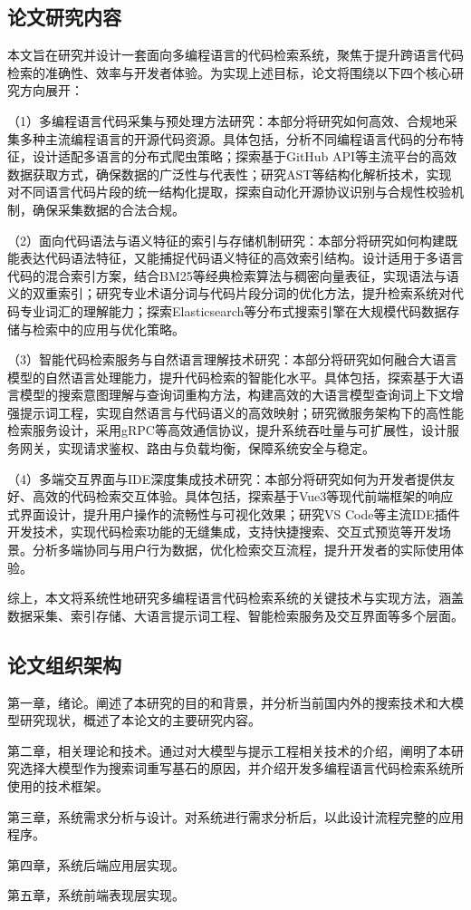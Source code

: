 \documentclass[UTF8,a4paper,12pt]{ctexart}
\numberwithin{equation}{section}
\begin{document}
\subsection{论文研究内容}
本文旨在研究并设计一套面向多编程语言的代码检索系统，聚焦于提升跨语言代码检索的准确性、效率与开发者体验。为实现上述目标，论文将围绕以下四个核心研究方向展开：\par
（1）多编程语言代码采集与预处理方法研究：本部分将研究如何高效、合规地采集多种主流编程语言的开源代码资源。具体包括，分析不同编程语言代码的分布特征，设计适配多语言的分布式爬虫策略；探索基于GitHub API等主流平台的高效数据获取方式，确保数据的广泛性与代表性；研究AST等结构化解析技术，实现对不同语言代码片段的统一结构化提取，探索自动化开源协议识别与合规性校验机制，确保采集数据的合法合规。\par
（2）面向代码语法与语义特征的索引与存储机制研究：本部分将研究如何构建既能表达代码语法特征，又能捕捉代码语义特征的高效索引结构。设计适用于多语言代码的混合索引方案，结合BM25等经典检索算法与稠密向量表征，实现语法与语义的双重索引；研究专业术语分词与代码片段分词的优化方法，提升检索系统对代码专业词汇的理解能力；探索Elasticsearch等分布式搜索引擎在大规模代码数据存储与检索中的应用与优化策略。\par
（3）智能代码检索服务与自然语言理解技术研究：本部分将研究如何融合大语言模型的自然语言处理能力，提升代码检索的智能化水平。具体包括，探索基于大语言模型的搜索意图理解与查询词重构方法，构建高效的大语言模型查询词上下文增强提示词工程，实现自然语言与代码语义的高效映射；研究微服务架构下的高性能检索服务设计，采用gRPC等高效通信协议，提升系统吞吐量与可扩展性，设计服务网关，实现请求鉴权、路由与负载均衡，保障系统安全与稳定。\par
（4）多端交互界面与IDE深度集成技术研究：本部分将研究如何为开发者提供友好、高效的代码检索交互体验。具体包括，探索基于Vue3等现代前端框架的响应式界面设计，提升用户操作的流畅性与可视化效果；研究VS Code等主流IDE插件开发技术，实现代码检索功能的无缝集成，支持快捷搜索、交互式预览等开发场景。分析多端协同与用户行为数据，优化检索交互流程，提升开发者的实际使用体验。\par
综上，本文将系统性地研究多编程语言代码检索系统的关键技术与实现方法，涵盖数据采集、索引存储、大语言提示词工程、智能检索服务及交互界面等多个层面。\par

\subsection{论文组织架构}
第一章，绪论。阐述了本研究的目的和背景，并分析当前国内外的搜索技术和大模型研究现状，概述了本论文的主要研究内容。\par
第二章，相关理论和技术。通过对大模型与提示工程相关技术的介绍，阐明了本研究选择大模型作为搜索词重写基石的原因，并介绍开发多编程语言代码检索系统所使用的技术框架。\par
第三章，系统需求分析与设计。对系统进行需求分析后，以此设计流程完整的应用程序。\par
第四章，系统后端应用层实现。\par
第五章，系统前端表现层实现。\par
\end{document}
